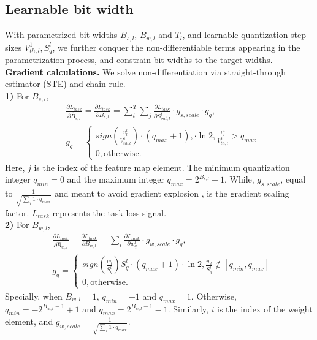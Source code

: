 \subsection{Learnable bit width} 
\label{sbsec:bit learn}
With parametrized bit widths $B_{s,l}$, $B_{w,l}$ and $T_l$, and learnable quantization step sizes $V^1_{th,l},S^l_q$, we further conquer the non-differentiable terms appearing in the parametrization process, and  constrain bit widths to the target widths. 
\\\textbf{Gradient calculations.} 
We solve non-differentiation via straight-through estimator (STE) \cite{bengio2013estimating} and chain rule. 
\\\textbf{1)} For  $B_{s,l}$, 
\begin{align}
    &\frac{\partial L_{task}}{\partial \hat{B}_{s,l}} = \frac{\partial L_{task}}{\partial B_{s,l}}= \sum^T_t \sum_j \frac{\partial L_{task}}{\partial S^t_{out,l}}  \cdot g_{s,scale}\cdot g_{q}, \\ 
&g_{q} =
\begin{cases}
sign(\frac{v^t_l}{V_{th,l}^1})   \cdot (q_{max}+1),   \cdot    \ln2   , \frac{v^t_l}{V_{th,l}^1}>q_{max} \\0, \text{otherwise}.
\end{cases}
\end{align}
Here, $j$ is the index of the feature map element. The minimum quantization integer $q_{min}=0$ and the maximum integer $q_{max}=2^{B_{s,l}}-1$. While, $g_{s,scale}$, equal to $\frac{1}{\sqrt{\sum_j1\cdot q_{max}}}$ and meant to avoid gradient explosion \cite{esser2020learned}, is the gradient scaling factor. $L_{task}$ represents the task loss signal.
\\\textbf{2)} For  $B_{w,l}$,
\begin{align}
    &\frac{\partial L_{task}}{\partial \hat{B}_{w,l}} = \frac{\partial L_{task}}{\partial B_{w,l}}=  \sum_i \frac{\partial L_{task}}{\partial w^l_q}  \cdot g_{w,scale} \cdot g_{q}, \\ 
&g_{q} =
\begin{cases}
sign( \frac{w_l}{S^l_q})  S^l_q \cdot (q_{max}+1)   \cdot    \ln2   , \frac{w_l}{S^l_q}\notin[q_{min}, q_{max}] \\0, \text{otherwise}.
\end{cases}
\end{align}
Specially, when $B_{w,l}=1$, $q_{min}=-1$ and $q_{max}=1$. Otherwise, $q_{min}=-2^{B_{w,l}-1}+1$ and $q_{max}=2^{B_{w,l}-1}-1$. Similarly,  $i$ is the index of the weight element, and $g_{w,scale} = \frac{1}{\sqrt{\sum_i1\cdot q_{max}}}$.
